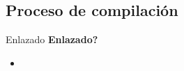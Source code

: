 
\subsection{Proceso de compilación}

\begin{frame}[fragile]{Enlazado}
\textbf{Enlazado?}
  \begin{itemize}[<+(1)->]
  \item
 \end{itemize}
\end{frame}